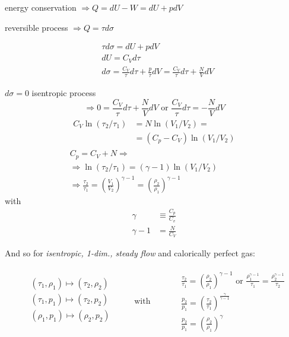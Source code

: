 \documentclass[10pt]{amsart}
\begin{document}
\begin{multicols*}{2}
energy conservation $\Longrightarrow Q = dU - W = dU + pdV$

reversible process $\Longrightarrow  Q = \tau d\sigma$ 

\[
\begin{aligned}
 &  \tau d\sigma = dU + pdV \\
  & dU = C_V d\tau \\
  & d\sigma = \frac{C_V}{\tau}d\tau + \frac{p}{\tau} dV = \frac{C_V}{\tau}d\tau + \frac{N}{V} dV 
\end{aligned}
\]

$d\sigma =0$ isentropic process
\[
\Longrightarrow 0 = \frac{C_V}{\tau}d\tau + \frac{N}{V} dV \text{ or } \frac{C_V}{\tau} d\tau = -\frac{N}{V} dV
  \]
  \[
\begin{gathered}
  \begin{aligned}  C_V \ln{ ( \tau_2 /\tau_1 ) } & = N \ln{ ( V_1 / V_2 ) } = \\
    & = (C_p - C_V) \ln{ (V_1/V_2) } \end{aligned} \\
  C_p = C_V + N \Longrightarrow \\
  \Longrightarrow \ln{ ( \tau_2/\tau_1) } = (\gamma -1) \ln{ (V_1/V_2) } \\
 \Longrightarrow \frac{\tau_2}{\tau_1} = \left( \frac{V_1}{V_2} \right)^{\gamma -1} = \left( \frac{\rho_2 }{\rho_1} \right)^{\gamma -1}
\end{gathered}
\]
with
\[
\begin{aligned}
  \gamma & \equiv \frac{C_p}{C_v} \\ 
  \gamma - 1 & = \frac{N}{C_V}
  \end{aligned}
\]

And so for \emph{isentropic, 1-dim., steady flow} and calorically perfect gas:

\begin{equation}
\begin{gathered}
  \begin{aligned}
    & (\tau_1, \rho_1) \mapsto (\tau_2, \rho_2) \\ 
    & (\tau_1, p_1) \mapsto (\tau_2, p_2) \\ 
    & (\rho_1, p_1) \mapsto (\rho_2, p_2) \\ 
  \end{aligned} \qquad \, \text{ with } \qquad \, \begin{aligned}
&    \frac{\tau_2}{\tau_1} = \left( \frac{\rho_2}{\rho_1} \right)^{\gamma-1} \text{ or } \frac{ \rho_1^{\gamma-1} }{ \tau_1} = \frac{ \rho_2^{\gamma-1}}{\tau_2} \\ 
 & \frac{p_2}{p_1} = \left( \frac{ \tau_2}{\tau_1} \right)^{ \frac{\gamma}{\gamma -1} } \\   
 & \frac{p_2}{p_1} = \left( \frac{ \rho_2}{\rho_1} \right)^{ \gamma } 
    \end{aligned}
\end{gathered}
  \end{equation}


\end{multicols*}
\end{document}
